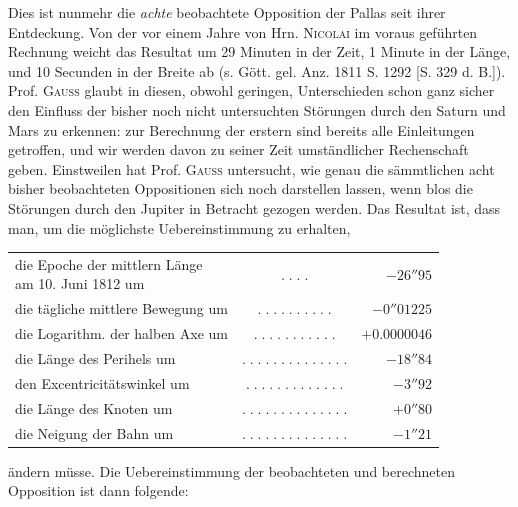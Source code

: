 \par\indent Dies ist nunmehr die \emph{achte} beobachtete Opposition der Pallas seit ihrer
Entdeckung. Von der vor einem Jahre von Hrn. \textsc{Nicolai} im voraus geführten
Rechnung weicht das Resultat um 29 Minuten in der Zeit, 1 Minute in der
Länge, und 10 Secunden in der Breite ab (s. Gött. gel. Anz. 1811 S. 1292
[S. 329 d. B.]). Prof. \textsc{Gauss} glaubt in diesen, obwohl geringen,
Unterschieden schon ganz sicher den Einfluss der bisher noch nicht
untersuchten Störungen durch den Saturn und Mars zu erkennen: zur
Berechnung der erstern sind bereits alle Einleitungen getroffen, und wir
werden davon zu seiner Zeit umständlicher Rechenschaft geben. Einstweilen
hat Prof. \textsc{Gauss} untersucht, wie genau die sämmtlichen acht bisher
beobachteten Oppositionen sich noch darstellen lassen, wenn blos die
Störungen durch den Jupiter in Betracht gezogen werden. Das Resultat ist,
dass man, um die möglichste Uebereinstimmung zu erhalten,

\begin{center}\fontsize{9}{11}\selectfont\setlength{\tabcolsep}{2pt}\renewcommand{\arraystretch}{1.15}\begin{tabular}{lcr}
\shortstack[l]{die Epoche der mittlern Länge\\am 10. Juni 1812 um} & $.\;.\;.\;.$ & $-26''95$\\
die tägliche mittlere Bewegung um & $.\;.\;.\;.\;.\;.\;.\;.\;.\;.$ & $-0''01225$\\
die Logarithm. der halben Axe um & $.\;.\;.\;.\;.\;.\;.\;.\;.\;.\;.$ & $+0.0000046$\\
die Länge des Perihels um & $.\;.\;.\;.\;.\;.\;.\;.\;.\;.\;.\;.\;.\;.$ & $-18''84$\\
den Excentricitätswinkel um & $.\;.\;.\;.\;.\;.\;.\;.\;.\;.\;.\;.\;.$ & $-3''92$\\
die Länge des Knoten um & $.\;.\;.\;.\;.\;.\;.\;.\;.\;.\;.\;.\;.\;.$ & $+0''80$\\
die Neigung der Bahn um & $.\;.\;.\;.\;.\;.\;.\;.\;.\;.\;.\;.\;.\;.$ & $-1''21$\\
\end{tabular}\end{center}

\noindent ändern müsse. Die Uebereinstimmung der beobachteten und berechneten
Opposition ist dann folgende:

